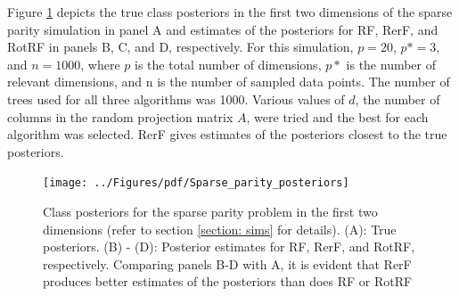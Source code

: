 \documentclass{article}
\begin{document}
Figure \ref{posteriors} depicts the true class posteriors in the first two dimensions of the sparse parity simulation in panel A and estimates of the posteriors for RF, RerF, and RotRF in panels B, C, and D, respectively. For this simulation, $p = 20$, $p* = 3$, and $n = 1000$, where $p$ is the total number of dimensions, $p*$ is the number of relevant dimensions, and n is the number of sampled data points. The number of trees used for all three algorithms was 1000. Various values of $d$, the number of columns in the random projection matrix $A$, were tried and the best for each algorithm was selected. RerF gives estimates of the posteriors closest to the true posteriors. 

\begin{figure}[ht]
\vskip 0.2in
\begin{center}
\centerline{\texttt{[image: ../Figures/pdf/Sparse\_parity\_posteriors]}}
\caption{Class posteriors for the sparse parity problem in the first two dimensions (refer to section \ref{section: sims} for details). (A): True posteriors. (B) - (D): Posterior estimates for RF, RerF, and RotRF, respectively. Comparing panels B-D with A, it is evident that RerF produces better estimates of the posteriors than does RF or RotRF}
\label{posteriors}
\end{center}
\vskip -0.2in
\end{figure}
\end{document}
